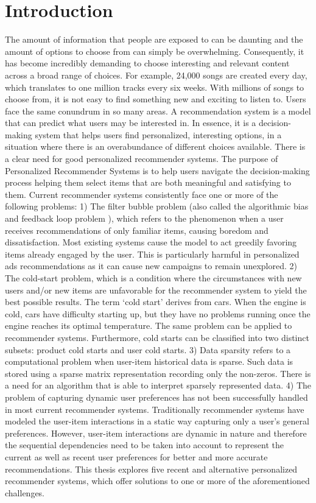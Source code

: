 \chapter{Introduction}

The amount of information that people are exposed to can be daunting and the amount of options to choose from can simply be overwhelming. Consequently, it has become incredibly demanding to choose interesting and relevant content across a broad range of choices. For example, 24,000 songs are created every day, which translates to one million tracks every six weeks. With millions of songs to choose from, it is not easy to find something new and exciting to listen to. Users face the same conundrum in so many areas. 
A recommendation system is a model that can predict what users may be interested in. In essence, it is a decision-making system that helps users find personalized, interesting options, in a situation where there is an overabundance of different choices 
available. There is a clear need for good personalized recommender systems. 
The purpose of Personalized Recommender Systems is to help users navigate the  decision-making process helping them select items that are both meaningful and satisfying to them.
Current recommender systems consistently face one or more of the following problems: 1) The filter bubble problem (also called the algorithmic bias and feedback loop problem ), which refers to the phenomenon when a user receives recommendations of only familiar items, causing boredom and dissatisfaction. Most existing systems cause the model to act greedily favoring items already engaged by the user. This is particularly harmful in personalized ads recommendations as it can cause new campaigns to remain unexplored. 2) The cold-start problem, which is a condition where the circumstances  with new users and/or new items are unfavorable for the recommender system to yield the best possible results. The term ‘cold start’ derives from cars. When the engine is cold, cars have difficulty starting up, but they have no problems running once the engine reaches its optimal temperature. The same problem can be applied to recommender systems. Furthermore, cold starts can be classified into two distinct subsets: product cold starts and user cold starts. 3) Data sparsity refers to a computational problem  when user-item historical data is sparse. Such data is stored using a sparse matrix representation recording only the non-zeros. There is a need for an algorithm that is able to interpret sparsely represented data. 4) The problem of capturing dynamic user preferences has not been successfully handled in most current recommender systems. Traditionally recommender systems have modeled the user-item interactions in a static way capturing only a user’s general preferences. However, user-item interactions are dynamic in nature and therefore the sequential dependencies need to be taken into account to represent the current as well as recent user preferences for better and more accurate recommendations. This thesis explores five recent and alternative personalized recommender systems, which offer solutions to one or more of the aforementioned challenges. 

